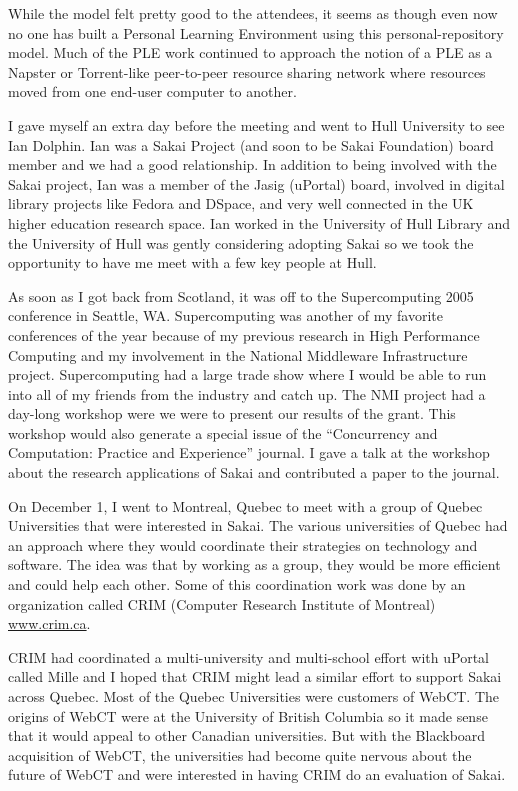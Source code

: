 \documentclass[12pt]{book}
\begin{document}
While the model felt pretty good to the attendees,
it seems as though even now no one
has built a Personal Learning Environment
using this personal-repository model.  Much of the PLE work
continued to approach the notion of a PLE as a Napster or Torrent-like
peer-to-peer resource sharing network where resources moved from one
end-user computer to another.

I gave myself an extra day before the meeting and went to Hull University
to see Ian Dolphin.   Ian was a Sakai Project (and soon to be Sakai
Foundation) board member and we had a good relationship.  In
addition to being involved with the Sakai project, Ian was a member of
the Jasig (uPortal) board, involved in digital library projects
like Fedora and DSpace, and very well connected in the UK higher
education research space.  Ian worked in the University of Hull Library
and the University of Hull was gently considering adopting Sakai
so we took the opportunity to have me meet with a few key people at
Hull.


As soon as I got back from Scotland, it was off to the Supercomputing
2005 conference in Seattle, WA.  Supercomputing was another of my
favorite conferences of the year because of my previous research in
High Performance Computing and my involvement in the National Middleware
Infrastructure project.   Supercomputing had a large trade show where
I would be able to run into all of my friends from the industry and
catch up.   The NMI project had a day-long workshop were we were
to present our results of the grant.  This workshop would also
generate a special issue of the ``Concurrency and Computation:
Practice and Experience'' journal.   I gave a talk
at the workshop about the research applications of Sakai and
contributed a paper to the journal.


On December 1, I went to Montreal, Quebec to meet with a group
of Quebec Universities that were interested in Sakai.
The various universities of Quebec had an approach
where they would coordinate their strategies on technology
and software.  The idea was that by working as a group, they
would be more efficient and could help each other.  Some
of this coordination work was done by an organization called
CRIM (Computer Research Institute of Montreal) {\url{www.crim.ca}}.

CRIM had coordinated a multi-university and multi-school effort
with uPortal called Mille and I hoped that CRIM might lead
a similar effort to support Sakai across Quebec.  Most of the
Quebec Universities were customers of WebCT.  The origins of
WebCT were at the University of British Columbia so it made
sense that it would appeal to other Canadian universities.
But with the Blackboard acquisition of WebCT, the universities
had become quite nervous about the future of WebCT and were
interested in having CRIM do an evaluation of Sakai.
\end{document}
